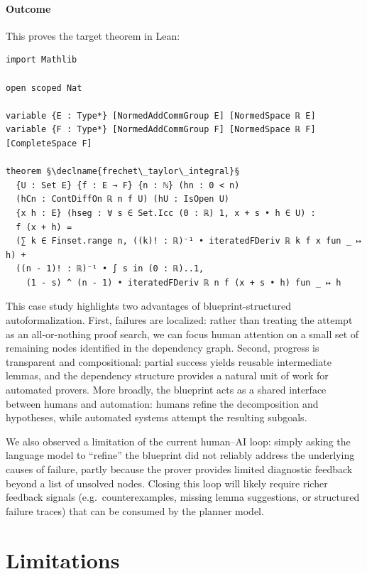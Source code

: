 \documentclass{article}
\newcommand{\declname}[1]{{\ttfamily\color{declnamecolor}#1}}
\begin{document}
\begin{samepage}
\paragraph{Outcome}
This proves the target theorem in Lean:
\begin{lstlisting}
import Mathlib

open scoped Nat

variable {E : Type*} [NormedAddCommGroup E] [NormedSpace ℝ E]
variable {F : Type*} [NormedAddCommGroup F] [NormedSpace ℝ F] [CompleteSpace F]

theorem §\declname{frechet\_taylor\_integral}§
  {U : Set E} {f : E → F} {n : ℕ} (hn : 0 < n)
  (hCn : ContDiffOn ℝ n f U) (hU : IsOpen U)
  {x h : E} (hseg : ∀ s ∈ Set.Icc (0 : ℝ) 1, x + s • h ∈ U) :
  f (x + h) =
  (∑ k ∈ Finset.range n, ((k)! : ℝ)⁻¹ • iteratedFDeriv ℝ k f x fun _ ↦ h) +
  ((n - 1)! : ℝ)⁻¹ • ∫ s in (0 : ℝ)..1,
    (1 - s) ^ (n - 1) • iteratedFDeriv ℝ n f (x + s • h) fun _ ↦ h
\end{lstlisting}
\end{samepage}

This case study highlights two advantages of blueprint-structured autoformalization. First, failures are localized: rather than treating the attempt as an all-or-nothing proof search, we can focus human attention on a small set of remaining nodes identified in the dependency graph. Second, progress is transparent and compositional: partial success yields reusable intermediate lemmas, and the dependency structure provides a natural unit of work for automated provers. More broadly, the blueprint acts as a shared interface between humans and automation: humans refine the decomposition and hypotheses, while automated systems attempt the resulting subgoals.

We also observed a limitation of the current human--AI loop: simply asking the language model to ``refine'' the blueprint did not reliably address the underlying causes of failure, partly because the prover provides limited diagnostic feedback beyond a list of unsolved nodes. Closing this loop will likely require richer feedback signals (e.g.\ counterexamples, missing lemma suggestions, or structured failure traces) that can be consumed by the planner model.

\section{Limitations}
\end{document}
